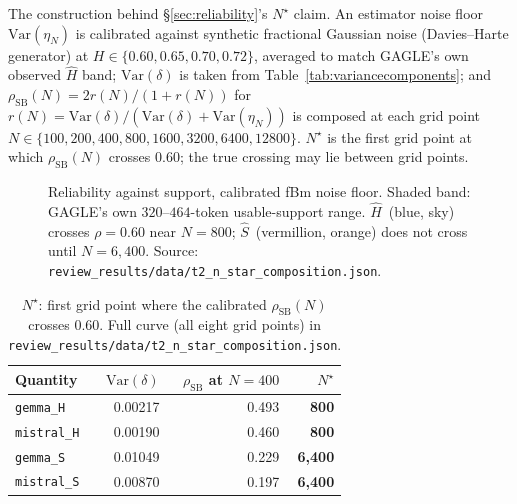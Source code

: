 \documentclass{article}
\newcommand{\Sest}{\ensuremath{\widehat{S}}}
\newcommand{\Hest}{\ensuremath{\widehat{H}}}
\newcommand{\Htrue}{\ensuremath{H}}
\begin{document}
The construction behind \S\ref{sec:reliability}'s $N^{\star}$ claim. An
estimator noise floor $\mathrm{Var}(\eta_N)$ is calibrated against synthetic
fractional Gaussian noise (Davies--Harte generator) at $\Htrue\in\{0.60,0.65,0.70,0.72\}$,
averaged to match GAGLE's own observed $\Hest$ band; $\mathrm{Var}(\delta)$ is
taken from Table~\ref{tab:variancecomponents}; and
$\rho_{\text{SB}}(N)=2r(N)/(1+r(N))$ for
$r(N)=\mathrm{Var}(\delta)/(\mathrm{Var}(\delta)+\mathrm{Var}(\eta_N))$ is
composed at each grid point $N\in\{100,200,400,800,1600,3200,6400,12800\}$.
$N^{\star}$ is the first grid point at which $\rho_{\text{SB}}(N)$ crosses
$0.60$; the true crossing may lie between grid points.

\begin{figure}[h]
\centering

\caption{Reliability against support, calibrated fBm noise floor.
Shaded band: GAGLE's own $320$--$464$-token usable-support range. \Hest\ (blue,
sky) crosses $\rho=0.60$ near $N{=}800$; \Sest\ (vermillion, orange) does not
cross until $N{=}6{,}400$. Source: \texttt{review\_results/data/t2\_n\_star\_composition.json}.}
\label{fig:nstar}
\end{figure}

\begin{table}[h]
\centering
\footnotesize
\caption{$N^{\star}$: first grid point where the calibrated $\rho_{\text{SB}}(N)$
crosses $0.60$. Full curve (all eight grid points) in
\texttt{review\_results/data/t2\_n\_star\_composition.json}.}
\label{tab:nstar}
\begin{tabular}{lrrr}
\toprule
Quantity & $\mathrm{Var}(\delta)$ & $\rho_{\text{SB}}$ at $N{=}400$ & $N^{\star}$ \\
\midrule
\texttt{gemma\_H}   & 0.00217 & 0.493 & \textbf{800} \\
\texttt{mistral\_H} & 0.00190 & 0.460 & \textbf{800} \\
\texttt{gemma\_S}   & 0.01049 & 0.229 & \textbf{6{,}400} \\
\texttt{mistral\_S} & 0.00870 & 0.197 & \textbf{6{,}400} \\
\bottomrule
\end{tabular}
\end{table}
\end{document}
